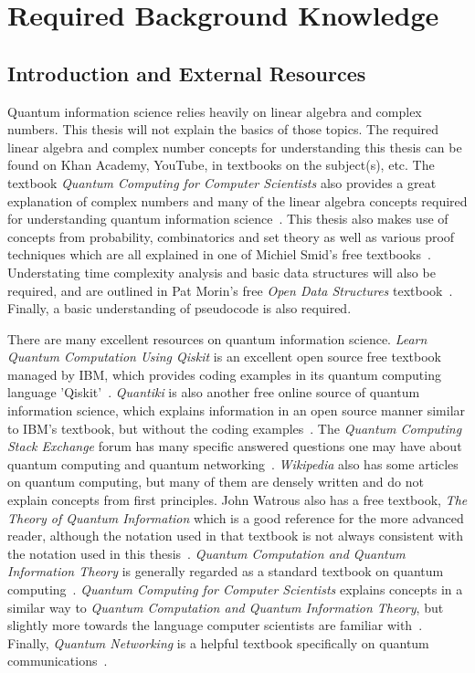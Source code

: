 \chapter{Required Background Knowledge}
\label{sec:RequiredBackgroundKnowledge}
\section{Introduction and External Resources}
Quantum information science relies heavily on linear algebra and complex numbers. This thesis will not explain the basics of those topics. The required linear algebra and complex number concepts for understanding this thesis can be found on Khan Academy, YouTube, in textbooks on the subject(s), etc. The textbook \emph{Quantum Computing for Computer Scientists} also provides a great explanation of complex numbers and many of the linear algebra concepts required for understanding quantum information science~\cite{yanofsky2008quantum}. This thesis also makes use of concepts from probability, combinatorics and set theory as well as various proof techniques which are all explained in one of Michiel Smid's free textbooks~\cite{michielSmidTextbook}. Understating time complexity analysis and basic data structures will also be required, and are outlined in Pat Morin's free \emph{Open Data Structures} textbook~\cite{morin2013open}. Finally, a basic understanding of pseudocode is also required.

There are many excellent resources on quantum information science. \emph{Learn Quantum Computation Using Qiskit} is an excellent open source free textbook managed by IBM, which provides coding examples in its quantum computing language 'Qiskit'~\cite{Qiskit-Textbook}. \emph{Quantiki} is also another free online source of quantum information science, which explains information in an open source manner similar to IBM's textbook, but without the coding examples~\cite{QuantikiRef}. The \emph{Quantum Computing Stack Exchange} forum has many specific answered questions one may have about quantum computing and quantum networking~\cite{QuantumComputingStackExchange}. \emph{Wikipedia} also has some articles on quantum computing, but many of them are densely written and do not explain concepts from first principles. John Watrous also has a free textbook, \emph{The Theory of Quantum Information} which is a good reference for the more advanced reader, although the notation used in that textbook is not always consistent with the notation used in this thesis~\cite{watrous2018theory}. \emph{Quantum Computation and Quantum Information Theory} is generally regarded as a standard textbook on quantum computing~\cite{nielsen2002quantum}. \emph{Quantum Computing for Computer Scientists} explains concepts in a similar way to \emph{Quantum Computation and Quantum Information Theory}, but slightly more towards the language computer scientists are familiar with~\cite{yanofsky2008quantum}. Finally, \emph{Quantum Networking} is a helpful textbook specifically on quantum communications~\cite{van2014quantum}.

